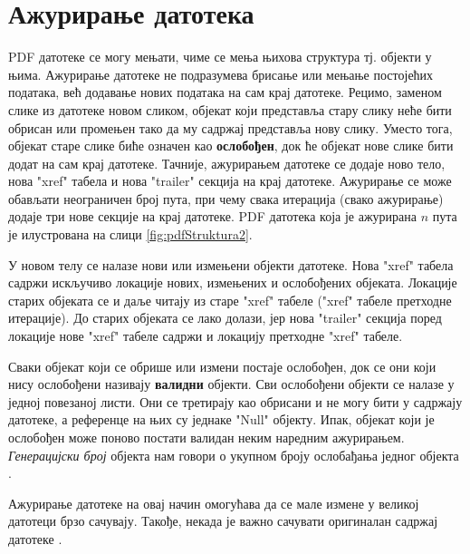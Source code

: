 \documentclass[12pt,oneside]{memoir}
\begin{document}
\section{Ажурирање датотека}
\label{sec:azuriranje}

PDF датотеке се могу мењати, чиме се мења њихова структура тј. објекти у њима. Ажурирање датотеке не подразумева брисање или мењање постојећих података, већ додавање нових података на сам крај датотеке. Рецимо, заменом слике из датотеке новом сликом, објекат који представља стару слику неће бити обрисан или промењен тако да му садржај представља нову слику. Уместо тога, објекат старе слике биће означен као \textbf{ослобођен}, док ће објекат нове слике бити додат на сам крај датотеке. Тачније, ажурирањем датотеке се додаје ново тело, нова "xref" табела и нова "trailer" секција на крај датотеке. Ажурирање се може обављати неограничен број пута, при чему свака итерација (свако ажурирање) додаје три нове секције на крај датотеке. PDF датотека која је ажурирана $n$ пута је илустрована на слици \ref{fig:pdfStruktura2}. 

У новом телу се налазе нови или измењени објекти датотеке. Нова "xref" табела садржи искључиво локације нових, измењених и ослобођених објеката. Локације старих објеката се и даље читају из старе "xref" табеле ("xref" табеле претходне итерације). До старих објеката се лако долази, јер нова "trailer" секција поред локације нове "xref" табеле садржи и локацију претходне "xref" табеле. 

Сваки објекат који се обрише или измени постаје ослобођен, док се они који нису ослобођени називају \textbf{валидни} објекти. Сви ослобођени објекти се налазе у једној повезаној листи. Они се третирају као обрисани и не могу бити у садржају датотеке, а референце на њих су једнаке "Null" објекту. Ипак, објекат који је ослобођен може поново постати валидан неким наредним ажурирањем. \textit{Генерацијски број} објекта нам говори о укупном броју ослобађања једног објекта \cite{PDFDoc, introToPdf, basicStrPdf}.

Ажурирање датотеке на овај начин омогућава да се мале измене у великој датотеци брзо сачувају. Такође, некада је важно сачувати оригиналан садржај датотеке \cite{PDFDoc}.
\end{document}
